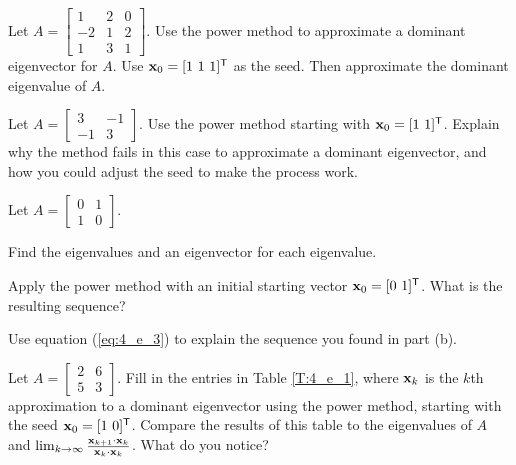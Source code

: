 \item Let $A = \left[ \begin{array}{rcc} 1&2&0\\-2&1&2 \\ 1&3&1 \end{array} \right]$. Use the power method to approximate a dominant eigenvector for $A$.  Use $\mathbf{x}_0 = [1 \ 1 \ 1]^{\mathsf{T}}$ as the seed. Then approximate the dominant eigenvalue of $A$. 

\item Let $A = \left[ \begin{array}{rr} 3&-1\\-1&3 \end{array} \right]$. Use the power method starting with $\mathbf{x}_0 = [1 \ 1]^{\mathsf{T}}$. Explain why the method fails in this case to approximate a dominant eigenvector, and how you could adjust the seed to make the process work.  

\item Let $A = \left[ \begin{array}{cc} 0&1\\1&0 \end{array} \right]$. 
	\ba
	\item Find the eigenvalues and an eigenvector for each eigenvalue.
	
	\item Apply the power method with an initial starting vector $\mathbf{x}_0 = [0 \ 1]^{\mathsf{T}}$. What is the resulting sequence? 
	
	\item Use equation (\ref{eq:4_e_3}) to explain the sequence you found in part (b).
	
	\ea


\item Let $A = \left[ \begin{array}{cc} 2&6 \\ 5&3 \end{array} \right]$. Fill in the entries in Table \ref{T:4_e_1}, where $\mathbf{x}_k$ is the $k$th approximation to a dominant eigenvector using the power method, starting with the seed $\mathbf{x}_0 = [1 \ 0]^{\mathsf{T}}$. Compare the results of this table to the eigenvalues of $A$ and $\lim_{k \to \infty} \frac{\mathbf{x}_{k+1}\cdot \mathbf{x}_k}{\mathbf{x}_k \cdot \mathbf{x}_k}$. What do you notice? 


